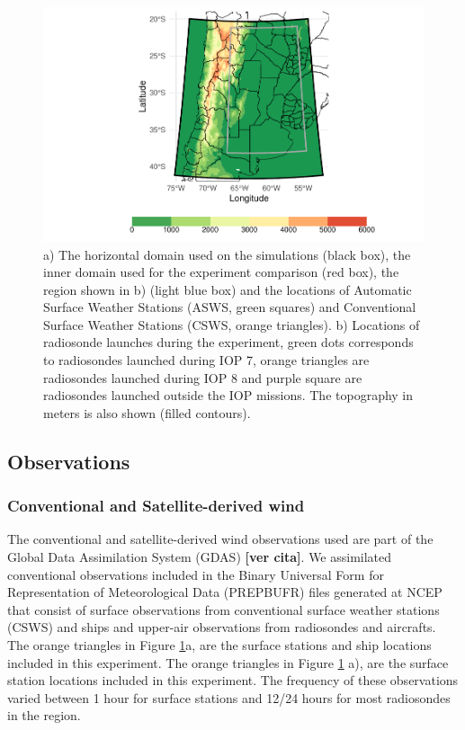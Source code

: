 \documentclass[final,5p,times,twocolumn,authoryear]{elsarticle} %
\begin{document}
\begin{figure}
\includegraphics[width=1\linewidth]{../figures/dominio-1} \caption{a) The horizontal domain used on the simulations (black box), the inner domain used for the experiment comparison (red box), the region shown in b) (light blue box) and the locations of Automatic Surface Weather Stations (ASWS, green squares) and Conventional Surface Weather Stations (CSWS, orange triangles). b) Locations of radiosonde launches during the experiment, green dots corresponds to radiosondes launched during IOP 7, orange triangles are radiosondes launched during IOP 8 and purple square are radiosondes launched outside the IOP missions. The topography in meters is also shown (filled contours).}\label{fig:dominio}
\end{figure}

\hypertarget{observations}{%
\subsection{Observations}\label{observations}}

\hypertarget{conventional-and-satellite-derived-wind}{%
\subsubsection{Conventional and Satellite-derived wind}\label{conventional-and-satellite-derived-wind}}

The conventional and satellite-derived wind observations used are part of the Global Data Assimilation System (GDAS) \textbf{{[}ver cita{]}}. We assimilated conventional observations included in the Binary Universal Form for Representation of Meteorological Data (PREPBUFR) files generated at NCEP that consist of surface observations from conventional surface weather stations (CSWS) and ships and upper-air observations from radiosondes and aircrafts. The orange triangles in Figure \ref{fig:dominio}a, are the surface stations and ship locations included in this experiment. The orange triangles in Figure \ref{fig:dominio} a), are the surface station locations included in this experiment. The frequency of these observations varied between 1 hour for surface stations and 12/24 hours for most radiosondes in the region.
\end{document}
